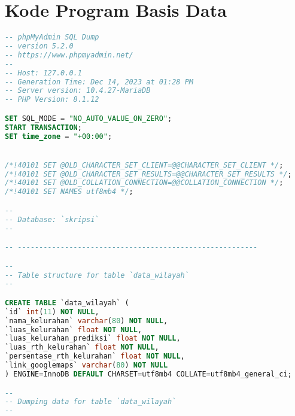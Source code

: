 \chapter{Kode Program Basis Data}
\label{lamp:basis-data}



\begin{lstlisting}[language=SQL]
-- phpMyAdmin SQL Dump
-- version 5.2.0
-- https://www.phpmyadmin.net/
--
-- Host: 127.0.0.1
-- Generation Time: Dec 14, 2023 at 01:28 PM
-- Server version: 10.4.27-MariaDB
-- PHP Version: 8.1.12

SET SQL_MODE = "NO_AUTO_VALUE_ON_ZERO";
START TRANSACTION;
SET time_zone = "+00:00";


/*!40101 SET @OLD_CHARACTER_SET_CLIENT=@@CHARACTER_SET_CLIENT */;
/*!40101 SET @OLD_CHARACTER_SET_RESULTS=@@CHARACTER_SET_RESULTS */;
/*!40101 SET @OLD_COLLATION_CONNECTION=@@COLLATION_CONNECTION */;
/*!40101 SET NAMES utf8mb4 */;

--
-- Database: `skripsi`
--

-- --------------------------------------------------------

--
-- Table structure for table `data_wilayah`
--

CREATE TABLE `data_wilayah` (
`id` int(11) NOT NULL,
`nama_kelurahan` varchar(80) NOT NULL,
`luas_kelurahan` float NOT NULL,
`luas_kelurahan_prediksi` float NOT NULL,
`luas_rth_kelurahan` float NOT NULL,
`persentase_rth_kelurahan` float NOT NULL,
`link_googlemaps` varchar(80) NOT NULL
) ENGINE=InnoDB DEFAULT CHARSET=utf8mb4 COLLATE=utf8mb4_general_ci;

--
-- Dumping data for table `data_wilayah`
--


\end{lstlisting}
